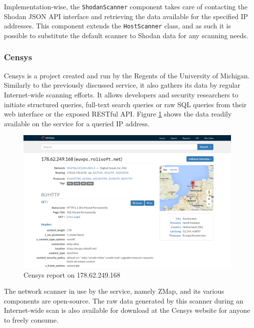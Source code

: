 \documentclass[a4paper,12pt]{article}
\begin{document}
	Implementation-wise, the \texttt{ShodanScanner} component takes care of contacting the Shodan JSON API interface and retrieving the data available for the specified IP addresses. This component extends the \texttt{HostScanner} class, and as such it is possible to substitute the default scanner to Shodan data for any scanning needs.

\subsubsection{Censys} \label{censys}
 

	Censys\cite{censys15} is a project created and run by the Regents of the University of Michigan. Similarly to the previously discussed service, it also gathers its data by regular Internet-wide scanning efforts. It allows developers and security researchers to initiate structured queries, full-text search queries or raw SQL queries from their web interface or the exposed RESTful API. Figure \ref{censysscr} shows the data readily available on the service for a queried IP address.
	
	\begin{figure}[!htbp]
		\centering
		\includegraphics[scale=0.355]{censys.png}
		\caption{Censys report on 178.62.249.168}
		\label{censysscr}
	\end{figure}
	
	The network scanner in use by the service, namely ZMap\cite{zmap13}, and its various components are open-source. The raw data generated by this scanner during an Internet-wide scan is also available for download at the Censys website for anyone to freely consume.
	
\end{document}
